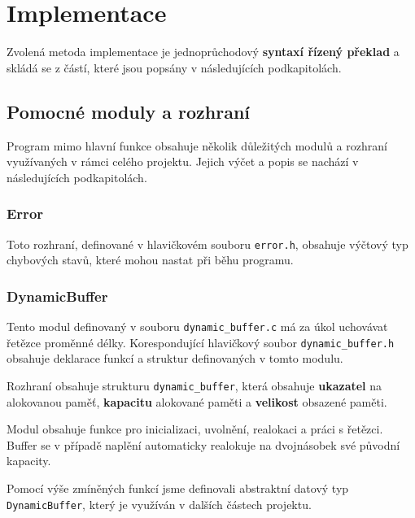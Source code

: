 \documentclass[a4paper, 11pt]{article}
\begin{document}
	\section{Implementace}
	Zvolená metoda implementace je jednoprůchodový \textbf{syntaxí řízený překlad} a skládá se z částí, které jsou popsány v následujících podkapitolách.

	\subsection{Pomocné moduly a rozhraní}
	Program mimo hlavní funkce obsahuje několik důležitých modulů a rozhraní využívaných v rámci celého projektu. Jejich výčet a popis se nachází v následujících podkapitolách.
	\subsubsection{Error}
	Toto rozhraní, definované v hlavičkovém souboru \texttt{error.h}, obsahuje výčtový typ chybových stavů, které mohou nastat při běhu programu.


	\subsubsection{DynamicBuffer}
	Tento modul definovaný v souboru \texttt{dynamic\_buffer.c} má za úkol uchovávat řetězce proměnné délky.
	Korespondující hlavičkový soubor \texttt{dynamic\_buffer.h} obsahuje deklarace funkcí a struktur definovaných v tomto modulu.
	\par\noindent Rozhraní obsahuje strukturu \texttt{dynamic\_buffer}, která obsahuje \textbf{ukazatel} na alokovanou paměť, \textbf{kapacitu} alokované paměti a \textbf{velikost} obsazené paměti.
	\par\noindent Modul obsahuje funkce pro inicializaci, uvolnění, realokaci a práci s řetězci. Buffer se v případě naplění automaticky realokuje na dvojnásobek své původní kapacity.
	\par\noindent Pomocí výše zmíněných funkcí jsme definovali abstraktní datový typ \texttt{DynamicBuffer}, který je využíván v dalších částech projektu.

	\newpage
\end{document}
